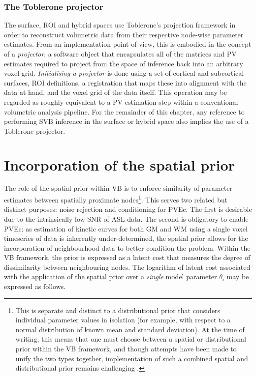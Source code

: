 \documentclass[12pt]{report}
\begin{document}
\subsubsection{The Toblerone projector}
\label{tob_projector_paragraph}

The surface, ROI and hybrid spaces use Toblerone's projection framework in order to reconstruct volumetric data from their respective node-wise parameter estimates. From an implementation point of view, this is embodied in the concept of a \textit{projector}, a software object that encapsulates all of the matrices and PV estimates required to project from the space of inference back into an arbitrary voxel grid. \textit{Initialising a projector} is done using a set of cortical and subcortical surfaces, ROI definitions, a registration that maps these into alignment with the data at hand, and the voxel grid of the data itself. This operation may be regarded as roughly equivalent to a PV estimation step within a conventional volumetric analysis pipeline. For the remainder of this chapter, any reference to performing SVB inference in the surface or hybrid space also implies the use of a Toblerone projector. 


\section{Incorporation of the spatial prior}
\label{svb_spatial_prior}

The role of the spatial prior within VB is to enforce similarity of parameter estimates between spatially proximate nodes\footnote{This is separate and distinct to a distributional prior that considers individual parameter values in isolation (for example, with respect to a normal distribution of known mean and standard deviation). At the time of writing, this means that one must choose between a spatial or distributional prior within the VB framework, and though attempts have been made to unify the two types together, implementation of such a combined spatial and distributional prior remains challenging \cite{Groves2009a}.}. This serves two related but distinct purposes: noise rejection and conditioning for PVEc. The first is desirable due to the intrinsically low SNR of ASL data. The second is obligatory to enable PVEc: as estimation of kinetic curves for both GM and WM using a single voxel timeseries of data is inherently under-determined, the spatial prior allows for the incorporation of neighbourhood data to better condition the problem. Within the VB framework, the prior is expressed as a latent cost that measures the degree of dissimilarity between neighbouring nodes. The logarithm of latent cost associated with the application of the spatial prior over a \textit{single} model parameter $\theta_i$ may be expressed as follows.  
\end{document}
